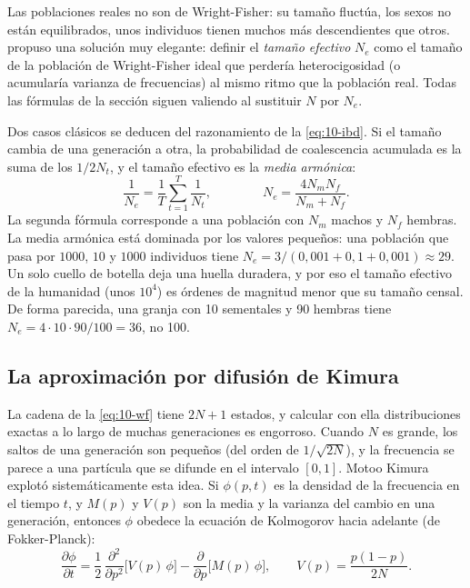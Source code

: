 Las poblaciones reales no son de Wright-Fisher: su tamaño fluctúa, los sexos no están equilibrados, unos individuos tienen muchos más descendientes que otros. \textcite{c10-wright1931} propuso una solución muy elegante: definir el \emph{tamaño efectivo} $N_e$ como el tamaño de la población de Wright-Fisher ideal que perdería heterocigosidad (o acumularía varianza de frecuencias) al mismo ritmo que la población real. Todas las fórmulas de la sección siguen valiendo al sustituir $N$ por $N_e$.

Dos casos clásicos se deducen del razonamiento de la \cref{eq:10-ibd}. Si el tamaño cambia de una generación a otra, la probabilidad de coalescencia acumulada es la suma de los $1/2N_t$, y el tamaño efectivo es la \emph{media armónica}:
\begin{equation}\label{eq:10-ne}
\frac{1}{N_e} = \frac{1}{T}\sum_{t=1}^{T}\frac{1}{N_t},\qquad\qquad N_e = \frac{4N_mN_f}{N_m+N_f}.
\end{equation}
La segunda fórmula corresponde a una población con $N_m$ machos y $N_f$ hembras. La media armónica está dominada por los valores pequeños: una población que pasa por $1000$, $10$ y $1000$ individuos tiene $N_e=3/(0{,}001+0{,}1+0{,}001)\approx29$. Un solo cuello de botella deja una huella duradera, y por eso el tamaño efectivo de la humanidad (unos $10^4$) es órdenes de magnitud menor que su tamaño censal. De forma parecida, una granja con 10 sementales y 90 hembras tiene $N_e=4\cdot10\cdot90/100=36$, no 100.

\begin{simbolos}
\end{simbolos}

\subsection{La aproximación por difusión de Kimura}

La cadena de la \cref{eq:10-wf} tiene $2N+1$ estados, y calcular con ella distribuciones exactas a lo largo de muchas generaciones es engorroso. Cuando $N$ es grande, los saltos de una generación son pequeños (del orden de $1/\sqrt{2N}$), y la frecuencia se parece a una partícula que se difunde en el intervalo $[0,1]$. Motoo Kimura explotó sistemáticamente esta idea. Si $\phi(p,t)$ es la densidad de la frecuencia en el tiempo $t$, y $M(p)$ y $V(p)$ son la media y la varianza del cambio en una generación, entonces $\phi$ obedece la ecuación de Kolmogorov hacia adelante (de Fokker-Planck):
\begin{equation}\label{eq:10-difusion}
\frac{\partial\phi}{\partial t} = \frac12\,\frac{\partial^2}{\partial p^2}\Big[V(p)\,\phi\Big] - \frac{\partial}{\partial p}\Big[M(p)\,\phi\Big],
\qquad V(p)=\frac{p(1-p)}{2N}.
\end{equation}

